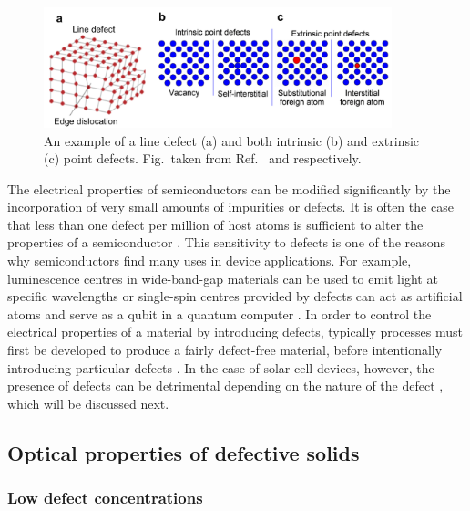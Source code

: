 \documentclass[11pt, twoside]{report}
\begin{document}
\begin{figure}[h!]
  \centering
    \includegraphics[width=0.9\textwidth]{figures/defects.png}
    \caption[An example of a line defect (a) and both intrinsic (b) and extrinsic (c) point defects.]{An example of a line defect (a) and both intrinsic (b) and extrinsic (c) point defects. Fig.~taken from Ref.~ and  respectively.}
  \label{defects}
\end{figure}

The electrical properties of semiconductors can be modified significantly by the incorporation of very small amounts of impurities or defects. It is often the case that less than one defect per million of host atoms is sufficient to alter the properties of a semiconductor \cite{fund_semi}. This sensitivity to defects is one of the reasons why semiconductors find many uses in device applications. For example, luminescence centres in wide-band-gap materials can be used to emit light at specific wavelengths or single-spin centres provided by defects can act as artificial atoms and serve as a qubit in a quantum computer \cite{defects_tutorial}. In order to control the electrical properties of a material by introducing defects, typically processes must first be developed to produce a fairly defect-free material, before intentionally introducing particular defects \cite{fund_semi}. In the case of solar cell devices, however, the presence of defects can be detrimental depending on the nature of the defect \cite{Aron_defect_tolerance}, which will be discussed next. 

\subsection{Optical properties of defective solids}
\subsubsection{Low defect concentrations}
\end{document}
